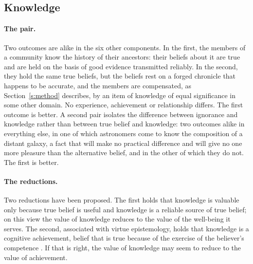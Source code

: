 \documentclass{situationist-preprint}
\begin{document}
\subsection{Knowledge}

\paragraph{The pair.} Two outcomes are alike in the six other components. In the first, the members of a community know the history of their ancestors: their beliefs about it are true and are held on the basis of good evidence transmitted reliably. In the second, they hold the same true beliefs, but the beliefs rest on a forged chronicle that happens to be accurate, and the members are compensated, as Section~\ref{s:method} describes, by an item of knowledge of equal significance in some other domain. No experience, achievement or relationship differs. The first outcome is better. A second pair isolates the difference between ignorance and knowledge rather than between true belief and knowledge: two outcomes alike in everything else, in one of which astronomers come to know the composition of a distant galaxy, a fact that will make no practical difference and will give no one more pleasure than the alternative belief, and in the other of which they do not. The first is better.

\paragraph{The reductions.} Two reductions have been proposed. The first holds that knowledge is valuable only because true belief is useful and knowledge is a reliable source of true belief; on this view the value of knowledge reduces to the value of the well-being it serves. The second, associated with virtue epistemology, holds that knowledge is a cognitive achievement, belief that is true because of the exercise of the believer's competence \citep{Sosa2007,Greco2010}. If that is right, the value of knowledge may seem to reduce to the value of achievement.
\end{document}
